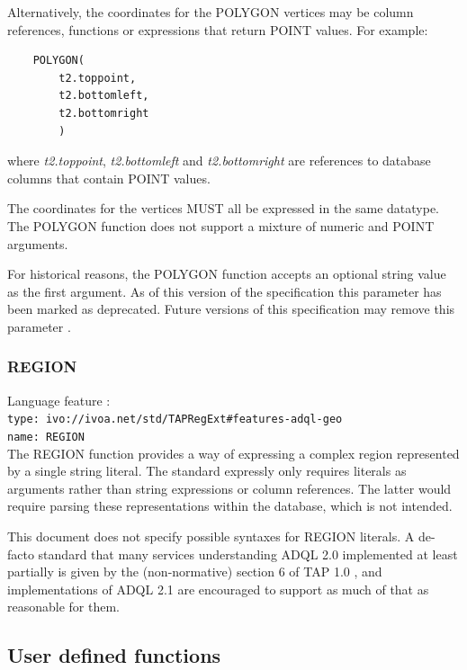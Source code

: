 \documentclass[11pt,a4paper]{ivoa}
\begin{document}
Alternatively, the coordinates for the POLYGON vertices may be column references,
functions or expressions that return POINT values.
For example:
\begin{verbatim}
    POLYGON(
        t2.toppoint,
        t2.bottomleft,
        t2.bottomright
        )
\end{verbatim}
\noindent
where \textit{t2.toppoint}, \textit{t2.bottomleft} and \textit{t2.bottomright}
are references to database columns that contain POINT values.

The coordinates for the vertices MUST all be expressed in the same datatype.
The POLYGON function does not support a mixture of numeric and POINT
arguments.

For historical reasons, the POLYGON function accepts an optional string
value as the first argument.
As of this version of the specification this parameter has been
marked as deprecated.
Future versions of this specification may remove this parameter
.

\subsubsection{REGION}
\label{sec:functions.geom.region}

{\footnotesize Language feature :}\\
{\footnotesize \verb|type: ivo://ivoa.net/std/TAPRegExt#features-adql-geo|}\\
{\footnotesize \verb|name: REGION|}\\


The REGION function provides a way of expressing a complex region
represented by a single string literal.  The standard expressly only
requires literals as arguments rather than string expressions or column
references.  The latter would require parsing these representations
within the database, which is not intended.

This document does not specify possible syntaxes for REGION
literals.  A de-facto standard that many services understanding ADQL 2.0
implemented at least partially is given by the (non-normative) section 6
of TAP 1.0 \citep{2010ivoa.spec.0327D}, and implementations of ADQL 2.1 are
encouraged to support as much of that as reasonable for them.

\subsection{User defined functions}
\label{sec:user.functions}
\end{document}
